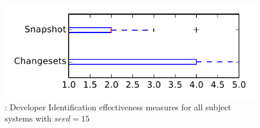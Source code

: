 
\begin{figure}
\centering
\includegraphics[height=0.4\textheight]{figures/dit_seed/rq1_tiny_15}
\caption{\rtwo: Developer Identification effectiveness measures for all subject systems with $seed=15$}
\label{fig:dit_seed:rq1:tiny}
\end{figure}
